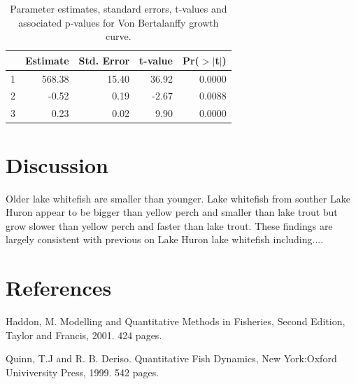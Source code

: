 \documentclass{article}
\begin{document}
\begin{table}[ht]
\centering
\begin{tabular}{rrrrr}
  \hline
 & Estimate & Std. Error & t-value & Pr($>$$|$t$|$) \\ 
  \hline
1 & 568.38 & 15.40 & 36.92 & 0.0000 \\ 
  2 & -0.52 & 0.19 & -2.67 & 0.0088 \\ 
  3 & 0.23 & 0.02 & 9.90 & 0.0000 \\ 
   \hline
\end{tabular}
\caption{Parameter estimates, standard errors, t-values and associated p-values for Von Bertalanffy growth curve.} 
\label{tbl:estimates}
\end{table}



\section*{Discussion}
\label{sec:discussion}

Older lake whitefish are smaller than younger.  Lake whitefish from
souther Lake Huron appear to be bigger than yellow perch and smaller
than lake trout but grow slower than yellow perch and faster than lake
trout.  These findings are largely consistent with previous on Lake
Huron lake whitefish including....


\clearpage
\section*{References}
\label{sec:references}

\vspace{10 mm}

Haddon, M. Modelling and Quantitative Methods in Fisheries, Second Edition, Taylor and Francis, 2001. 424 pages.

\vspace{10 mm}

Quinn, T.J and R. B. Deriso. Quantitative Fish Dynamics, New York:Oxford Univiversity Press, 1999. 542 pages.
\end{document}
